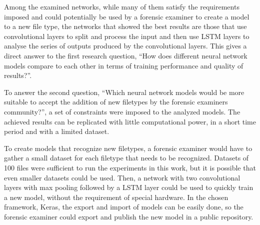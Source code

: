 Among the examined networks, while many of them satisfy the requirements imposed and could potentially be used by a forensic examiner to create a model to a new file type, the networks that showed the best results are those that use convolutional layers to split and process the input and then use LSTM layers to analyse the series of outputs produced by the convolutional layers. This gives a direct answer to the first research question, ``How does different neural network models compare to each other in terms of training performance and quality of results?''.

To answer the second question, ``Which neural network models would be more suitable to accept the addition of new filetypes by the forensic examiners community?'', a set of constraints were imposed to the analyzed models. The achieved results can be replicated with little computational power, in a short time period and with a limited dataset.

To create models that recognize new filetypes, a forensic examiner would have to gather a small dataset for each filetype that needs to be recognized. Datasets of 100 files were sufficient to run the experiments in this work, but it is possible that even smaller datasets could be used. Then, a network with two convolutional layers with max pooling followed by a LSTM layer could be used to quickly train a new model, without the requirement of special hardware. In the chosen framework, Keras, the export and import of models can be easily done, so the forensic examiner could export and publish the new model in a public repository.

